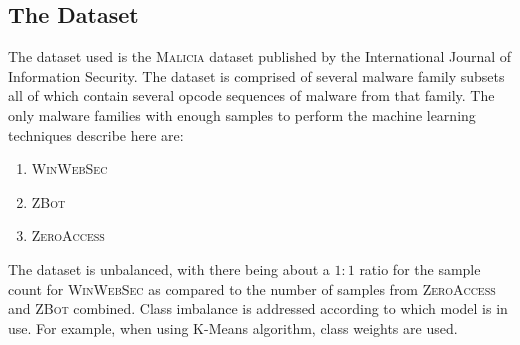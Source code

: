 \documentclass[12pt]{article}
\begin{document}
\subsection{The Dataset}
The dataset used is the \textsc{Malicia} dataset published by the International Journal of Information Security. The dataset is comprised of several malware family subsets all of which contain several opcode sequences of malware from that family. The only malware families with enough samples to perform the machine learning techniques describe here are: 
\begin{enumerate}
  \item \textsc{WinWebSec}
  \item \textsc{ZBot}
  \item \textsc{ZeroAccess}
\end{enumerate}

The dataset is unbalanced, with there being about a $1:1$ ratio for the sample count for \textsc{WinWebSec} as compared to the number of samples from \textsc{ZeroAccess} and \textsc{ZBot} combined. Class imbalance is addressed according to which model is in use. For example, when using K-Means algorithm, class weights are used.
\end{document}
